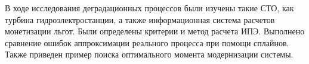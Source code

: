 В ходе исследования деградационных процессов были изучены такие СТО, как турбина гидроэлектростанции,
а также информационная система расчетов монетизации льгот.
Были определены критерии и метод расчета ИПЭ. 
Выполнено сравнение ошибок аппроксимации реального процесса при помощи сплайнов.
Также приведен пример поиска оптимального момента модернизации системы.







